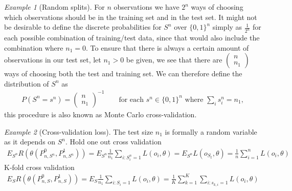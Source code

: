 \documentclass[11pt, a4paper]{article}
\theoremstyle{definition}
\theoremstyle{remark}
\newtheorem{example}{Example}
\newcommand{\Sn}{S^n}
\begin{document}
\begin{example}[Random splits] \label{splits}
   For $ n $ observations we have $ 2^{n} $ ways of choosing which observations should be in the training set and in the test set. It might not be desirable to define the discrete probabilities for $ \Sn $ over $ \{0,1\}^{n} $ simply as $ \frac{1}{2^{n}} $ for each possible combination of training/test data, since that would also include the combination where $ n_1 = 0 $. To ensure that there is always a certain amount of observations in our test set, let $ n_1 > 0 $ be given, we see that there are $ \begin{pmatrix}
        n \\ n_1
    \end{pmatrix}$ ways of choosing both the test and training set. We can therefore define the distribution of $ \Sn $ as 
    \begin{align*}
        P \left(\Sn = s^n \right) = \begin{pmatrix}
            n \\ n_1
    \end{pmatrix}^{-1} \qquad \text{for each } s^n \in \{0,1\}^{n} \text{ where } \sum_{i} s^n_i = n_1,
    \end{align*}
    this procedure is also known as Monte Carlo cross-validation.
\end{example}

\begin{example}[Cross-validation loss]
   The test size $ n_1 $ is formally a random variable as it depends on $ \Sn $.
   Hold one out cross validation
   \begin{align*}
       E_{\Sn} R(\theta(P_{n, \Sn}^{0} , P_{n, \Sn}^{1}))= E_{\Sn} \frac{1}{n_1} \sum_{i : \Sn_i = 1} L(o_i, \theta) = E_{\Sn} L(o_{S_t}, \theta) = \frac{1}{n} \sum_{i = 1}^{n} L(o_i, \theta) 
   \end{align*}
  K-fold cross validation 
  \begin{align*}
      E_S R(\theta(P_{n, S}^{0} , P_{n, S}^{1}))= E_S \frac{1}{n_1} \sum_{i : S_i = 1} L(o_i, \theta) =  \frac{1}{K} \sum_{k = 1}^{K} \sum_{i:s_{k,i} = 1} L(o_i, \theta) 
  \end{align*}
  
\end{example}
\end{document}

